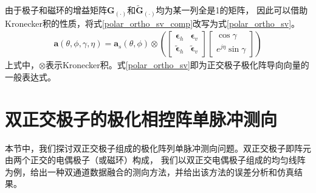 \documentclass[master]{thesis-uestc}
\begin{document}
由于极子和磁环的增益矩阵$\bm{G}_{(\cdot)}$和$\tilde{\bm{G}}_{(\cdot)}$均为某一列全是1的矩阵，
因此可以借助Kronecker积的性质，将式\eqref{polar_ortho_sv_comp}改写为式\eqref{polar_ortho_sv}。
\begin{equation}\label{polar_ortho_sv}
    \begin{aligned}
        \bm{a}(\theta,\phi,\gamma,\eta) = 
        \bm{a}_s(\theta,\phi) \otimes 
        \left(
            \begin{bmatrix}
                \bm{\epsilon}_h & \bm{\epsilon}_v \\
                \tilde{\bm{\epsilon}}_h & \tilde{\bm{\epsilon}}_v
            \end{bmatrix}
            \begin{bmatrix}
                \cos\gamma \\ e^{j\eta}\sin\gamma
            \end{bmatrix}
        \right)
    \end{aligned}
\end{equation}
上式中，$\otimes$表示Kronecker积。式\eqref{polar_ortho_sv}即为正交极子极化阵导向向量的一般表达式。

\section{双正交极子的极化相控阵单脉冲测向}
本节中，我们探讨双正交极子组成的极化阵列单脉冲测向问题。双正交极子即阵元由两个正交的电偶极子（或磁环）构成，
我们以双正交电偶极子组成的均匀线阵为例，给出一种双通道数据融合的测向方法，并给出该方法的误差分析和仿真结果。
\end{document}
